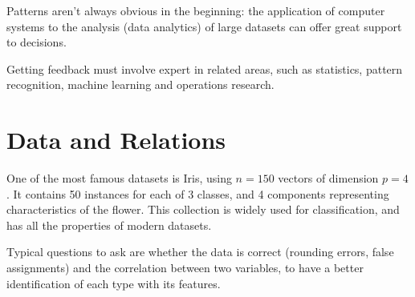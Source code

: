 Patterns aren't always obvious in the beginning: the application of computer systems to the analysis (data analytics) of large datasets can offer great support to decisions.

Getting feedback must involve expert in related areas, such as statistics, pattern recognition, machine learning and operations research.

\section{Data and Relations}
One of the most famous datasets is Iris, using $n = 150$ vectors of dimension $p = 4$.
It contains 50 instances for each of 3 classes, and 4 components representing characteristics of the flower. This collection is widely used for classification, and has all the properties of modern datasets. 

Typical questions to ask are whether the data is correct (rounding errors, false assignments) and the correlation between two variables, to have a better identification of each type with its features. 

